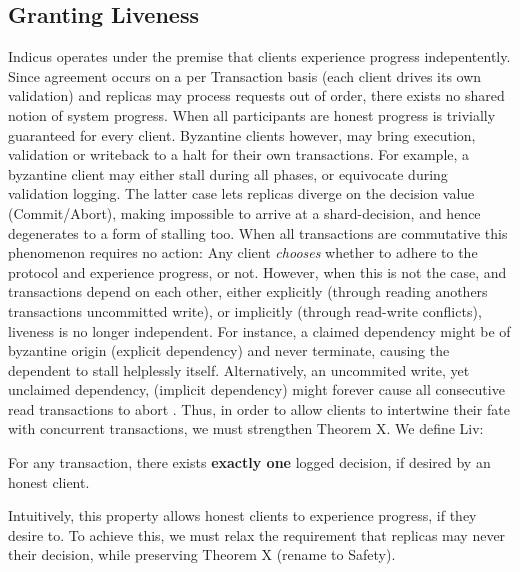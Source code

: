 \subsection{Granting Liveness}
Indicus operates under the premise that clients experience progress indepentently. Since agreement occurs on a per Transaction basis (each client drives its own validation) and replicas may process requests out of order, there exists no shared notion of system progress. When all participants are honest progress is trivially guaranteed for every client. Byzantine clients however, may bring execution, validation or writeback to a halt for their own transactions. For example, a byzantine client may either stall during all phases, or equivocate during validation logging. The latter case lets replicas diverge on the decision value (Commit/Abort), making impossible to arrive at a shard-decision, and hence degenerates to a form of stalling too. When all transactions are commutative this phenomenon requires no action: Any client \textit{chooses} whether to adhere to the protocol and experience progress, or not. However, when this is not the case, and transactions depend on each other, either explicitly (through reading anothers transactions uncommitted write), or implicitly (through read-write conflicts), liveness is no longer independent. For instance, a claimed dependency might be of byzantine origin (explicit dependency) and never terminate, causing the dependent to stall helplessly itself. Alternatively, an uncommited write, yet unclaimed dependency, (implicit dependency) might forever cause all consecutive read transactions to abort  .
Thus, in order to allow clients to intertwine their fate with concurrent transactions, we must strengthen Theorem X. We define Liv:

\begin{theorem}[Liv] 
For any transaction, there exists \textbf{exactly one} logged decision, if desired by an honest client.
\end{theorem}
Intuitively, this property allows honest clients to experience progress, if they desire to. To achieve this, we must relax the requirement that replicas may never their decision, while preserving Theorem X (rename to Safety).


